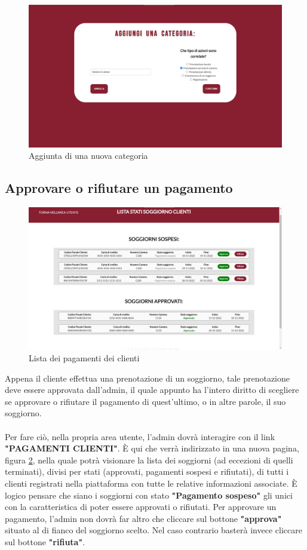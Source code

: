 \documentclass [a4paper, 12pt]{book}
\begin{document}
\begin{figure}[h]
\centering
\includegraphics[scale=0.3]{AggiungiCategoria.png}
\caption{Aggiunta di una nuova categoria}
\label{AggiungiCategoria}
\end{figure}

\subsection{Approvare o rifiutare un pagamento}
\begin{figure}[h]
\centering
\includegraphics[scale=0.25]{Pagamenti.png}
\caption{Lista dei pagamenti dei clienti}
\label{Pagamenti}
\end{figure}
Appena il cliente effettua una prenotazione di un soggiorno, tale prenotazione deve essere approvata dall'admin, il quale appunto ha l'intero diritto di scegliere se approvare o rifiutare il pagamento di quest'ultimo, o in altre parole, il suo soggiorno. \\\\
Per fare ciò, nella propria area utente, l'admin dovrà interagire con il link \textbf{"PAGAMENTI CLIENTI"}. È qui che verrà indirizzato in una nuova pagina, figura \ref{Pagamenti}, nella quale potrà visionare la lista dei soggiorni (ad eccezioni di quelli terminati), divisi per stati (approvati, pagamenti sospesi e rifiutati), di tutti i clienti registrati nella piattaforma con tutte le relative informazioni associate. È logico pensare che siano i soggiorni con stato \textbf{"Pagamento sospeso"} gli unici con la caratteristica di poter essere approvati o rifiutati. 
Per approvare un pagamento, l'admin non dovrà far altro che cliccare sul bottone \textbf{"approva"} situato al di fianco del soggiorno scelto. Nel caso contrario basterà invece cliccare sul bottone \textbf{"rifiuta"}. 
\end{document}
